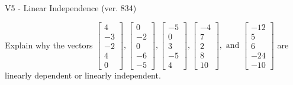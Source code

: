\begin{exercise}
  \begin{exerciseTitle}V5 - Linear Independence (ver. 834)\end{exerciseTitle}
  \begin{exerciseStatement}
    Explain why the vectors \(\left[\begin{array}{r}
4 \\
-3 \\
-2 \\
4 \\
0
\end{array}\right] , \left[\begin{array}{r}
0 \\
-2 \\
0 \\
-6 \\
-5
\end{array}\right] , \left[\begin{array}{r}
-5 \\
0 \\
3 \\
-5 \\
4
\end{array}\right] , \left[\begin{array}{r}
-4 \\
7 \\
2 \\
8 \\
10
\end{array}\right] , \text{ and } \left[\begin{array}{r}
-12 \\
5 \\
6 \\
-24 \\
-10
\end{array}\right]\) are linearly dependent or linearly independent.	



\end{exerciseStatement}
\end{exercise}
